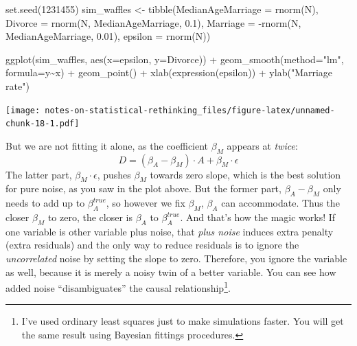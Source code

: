\documentclass[
]{book}
\newenvironment{Shaded}{\begin{snugshade}}{\end{snugshade}}
\newcommand{\AttributeTok}[1]{\textcolor[rgb]{0.77,0.63,0.00}{#1}}
\newcommand{\DecValTok}[1]{\textcolor[rgb]{0.00,0.00,0.81}{#1}}
\newcommand{\FloatTok}[1]{\textcolor[rgb]{0.00,0.00,0.81}{#1}}
\newcommand{\FunctionTok}[1]{\textcolor[rgb]{0.00,0.00,0.00}{#1}}
\newcommand{\NormalTok}[1]{#1}
\newcommand{\OtherTok}[1]{\textcolor[rgb]{0.56,0.35,0.01}{#1}}
\newcommand{\SpecialCharTok}[1]{\textcolor[rgb]{0.00,0.00,0.00}{#1}}
\newcommand{\StringTok}[1]{\textcolor[rgb]{0.31,0.60,0.02}{#1}}
\begin{document}
\begin{Shaded}
\begin{Highlighting}[]
\FunctionTok{set.seed}\NormalTok{(}\DecValTok{1231455}\NormalTok{)}
\NormalTok{sim\_waffles }\OtherTok{\textless{}{-}} \FunctionTok{tibble}\NormalTok{(}\AttributeTok{MedianAgeMarriage =} \FunctionTok{rnorm}\NormalTok{(N),}
                      \AttributeTok{Divorce =} \FunctionTok{rnorm}\NormalTok{(N, MedianAgeMarriage, }\FloatTok{0.1}\NormalTok{),}
                      \AttributeTok{Marriage =} \SpecialCharTok{{-}}\FunctionTok{rnorm}\NormalTok{(N, MedianAgeMarriage, }\FloatTok{0.01}\NormalTok{),}
                      \AttributeTok{epsilon =} \FunctionTok{rnorm}\NormalTok{(N))}

\FunctionTok{ggplot}\NormalTok{(sim\_waffles, }\FunctionTok{aes}\NormalTok{(}\AttributeTok{x=}\NormalTok{epsilon, }\AttributeTok{y=}\NormalTok{Divorce)) }\SpecialCharTok{+} 
  \FunctionTok{geom\_smooth}\NormalTok{(}\AttributeTok{method=}\StringTok{"lm"}\NormalTok{, }\AttributeTok{formula=}\NormalTok{y}\SpecialCharTok{\textasciitilde{}}\NormalTok{x) }\SpecialCharTok{+} 
  \FunctionTok{geom\_point}\NormalTok{() }\SpecialCharTok{+} 
  \FunctionTok{xlab}\NormalTok{(}\FunctionTok{expression}\NormalTok{(epsilon)) }\SpecialCharTok{+} 
  \FunctionTok{ylab}\NormalTok{(}\StringTok{"Marriage rate"}\NormalTok{)}
\end{Highlighting}
\end{Shaded}

\texttt{[image: notes-on-statistical-rethinking\_files/figure-latex/unnamed-chunk-18-1.pdf]}

But we are not fitting it alone, as the coefficient \(\beta_M\) appears at \emph{twice}:
\[D = (\beta_A  - \beta_M) \cdot A + \beta_M \cdot \epsilon\]
The latter part, \(\beta_M \cdot \epsilon\), pushes \(\beta_M\) towards zero slope, which is the best solution for pure noise, as you saw in the plot above. But the former part, \(\beta_A - \beta_M\) only needs to add up to \(\beta_A^{true}\), so however we fix \(\beta_M\), \(\beta_A\) can accommodate. Thus the closer \(\beta_M\) to zero, the closer is \(\beta_A\) to \(\beta_A^{true}\). And that's how the magic works! If one variable is other variable plus noise, that \emph{plus noise} induces extra penalty (extra residuals) and the only way to reduce residuals is to ignore the \emph{uncorrelated} noise by setting the slope to zero. Therefore, you ignore the variable as well, because it is merely a noisy twin of a better variable. You can see how added noise ``disambiguates'' the causal relationship\footnote{I've used ordinary least squares just to make simulations faster. You will get the same result using Bayesian fittings procedures.}.
\end{document}
